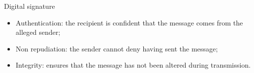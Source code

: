 \documentclass[slidescentered]{beamer}
\begin{document}
\begin{frame}{Digital signature}
\begin{center}
        	\begin{itemize}
        		\item Authentication: the recipient is confident that the message comes from the alleged sender;
        		\item Non repudiation: the sender cannot deny having sent the message;
        		\item Integrity: ensures that the message has not been altered during transmission.
        	\end{itemize}
        \end{center}
    \end{frame}
\end{document}
